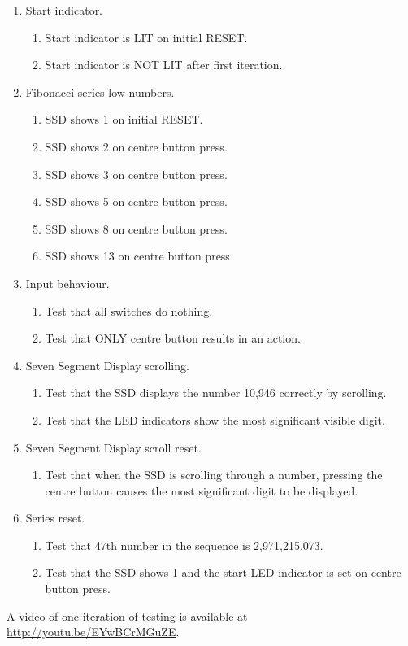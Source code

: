 \documentclass[12pt,a4paper]{article}
\begin{document}
\begin{enumerate}
\item Start indicator.
  \begin{enumerate}
  \item Start indicator is LIT on initial RESET.
  \item Start indicator is NOT LIT after first iteration.
  \end{enumerate}
\item Fibonacci series low numbers.
  \begin{enumerate}
  \item SSD shows 1 on initial RESET.
  \item SSD shows 2 on centre button press.
  \item SSD shows 3 on centre button press.
  \item SSD shows 5 on centre button press.
  \item SSD shows 8 on centre button press.
  \item SSD shows 13 on centre button press
  \end{enumerate}
\item Input behaviour.
  \begin{enumerate}
  \item Test that all switches do nothing.
  \item Test that ONLY centre button results in an action.
  \end{enumerate}
\item Seven Segment Display scrolling.
  \begin{enumerate}
  \item Test that the SSD displays the number 10,946 correctly by scrolling.
  \item Test that the LED indicators show the most significant visible digit.
  \end{enumerate}
\item Seven Segment Display scroll reset.
  \begin{enumerate}
  \item Test that when the SSD is scrolling through a number, pressing
    the centre button causes the most significant digit to be
    displayed.
  \end{enumerate}
\item Series reset.
  \begin{enumerate}
  \item Test that 47th number in the sequence is 2,971,215,073.
  \item Test that the SSD shows 1 and the start LED indicator is set
    on centre button press.
  \end{enumerate}
\end{enumerate}

\noindent
A video of one iteration of testing is available at
\url{http://youtu.be/EYwBCrMGuZE}.
\end{document}

